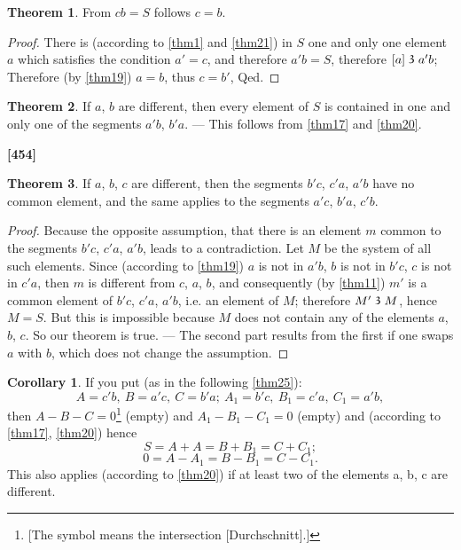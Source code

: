 \documentclass[leqno, hidelinks]{article}
\theoremstyle{definition}
\newtheorem{theorem}{Theorem}
\newtheorem*{corollary}{Corollary}
\newcommand\partof{\mathrel{\raisebox{0.45ex}{$\mathfrak{3}$}}}
\begin{document}
\begin{theorem}\label{thm22}
From $cb=S$ follows $c = b$.
\end{theorem}

\begin{proof}
There is (according to \ref{thm1} and \ref{thm21}) in $S$ one and only one element $a$ which satisfies the condition $a'=c$, and therefore $a'b = S$, therefore $[a] \partof a'b$; Therefore (by \ref{thm19}) $a=b$, thus $c=b'$, Qed.
\end{proof}

\begin{theorem}\label{thm23}
If $a$, $b$ are different, then every element of $S$ is contained in one and only one of the segments $a'b$, $b'a$. --- This follows from \ref{thm17} and \ref{thm20}.
\end{theorem}

\noindent \textbf{[454]}

\begin{theorem}\label{thm24}
If $a$, $b$, $c$ are different, then the segments $b'c$, $c'a$, $a'b$ have no common element, and the same applies to the segments $a'c$, $b'a$, $c'b$.
\end{theorem}
\begin{proof}
Because the opposite assumption, that there is an element $m$ common to the segments $b'c$, $c'a$, $a'b$, leads to a contradiction.
Let $M$ be the system of all such elements.
Since (according to \ref{thm19}) $a$ is not in $a'b$, $b$ is not in $b'c$, $c$ is not in $c'a$, then $m$ is different from $c$, $a$, $b$, and consequently (by \ref{thm11}) $m'$ is a common element of $b'c$, $c'a$, $a'b$, i.e. an element of $M$; therefore $M' \partof M$, hence  $M=S$.
But this is impossible because $M$ does not contain any of the elements $a$, $b$, $c$. So our theorem is true.
--- The second part results from the first if one swaps $a$ with $b$, which does not change the assumption.\end{proof}

\begin{corollary}
If you put (as in the following \ref{thm25}):
\[
    A=c'b,\ B=a'c,\ C = b'a;\ A_1 = b'c,\ B_1 = c'a,\ C_1 = a'b,
\]
then $A-B-C=0$\footnote{[The symbol means the intersection [Durchschnitt].]} (empty) and $A_1- B_1 - C_1=0$ (empty) and (according to \ref{thm17}, \ref{thm20}) hence
\[
S = A + A = B + B_1 = C +C_1;
\]
\[
0=A-A_1=B-B_1=C-C_1.
\]
This also applies (according to \ref{thm20}) if at least two of the elements a, b, c are different.\end{corollary}
\end{document}
